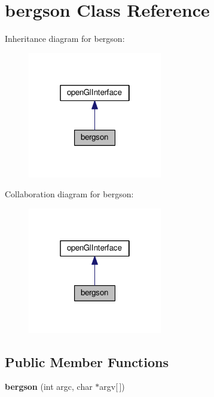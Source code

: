 \hypertarget{classbergson}{}\section{bergson Class Reference}
\label{classbergson}


Inheritance diagram for bergson\+:
\nopagebreak
\begin{figure}[H]
\begin{center}
\leavevmode
\includegraphics[width=166pt]{classbergson__inherit__graph}
\end{center}
\end{figure}


Collaboration diagram for bergson\+:
\nopagebreak
\begin{figure}[H]
\begin{center}
\leavevmode
\includegraphics[width=166pt]{classbergson__coll__graph}
\end{center}
\end{figure}
\subsection*{Public Member Functions}
\begin{DoxyCompactItemize}
\item 
\mbox{\label{classbergson_a926def93d37576874603609c418d758d}} 
{\bfseries bergson} (int argc, char $\ast$argv\mbox{[}$\,$\mbox{]})
\end{DoxyCompactItemize}
